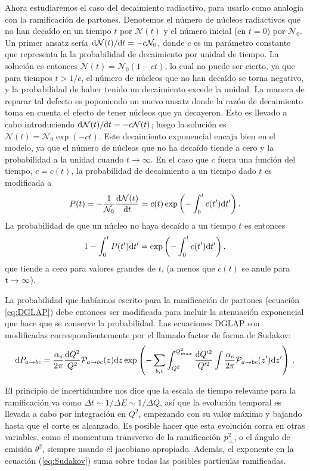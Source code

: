 \documentclass[a4paper,12pt]{article}
\begin{document}
Ahora estudiaremos el caso del decaimiento radiactivo, para usarlo como analogía con la ramificación de partones. Denotemos el número de núcleos radiactivos que no han decaído en un tiempo $t$ por $\mathcal N(t)$ y el número inicial (en $t=0$) por $\mathcal N_0$. Un primer ansatz sería ${\mathrm d}\mathcal N(t)/{\mathrm d} t = -c \mathcal N_0$, donde $c$ es un parámetro constante que representa la la probabilidad de decaimiento por unidad de tiempo. La solución es entonces $\mathcal N (t) = \mathcal N_0(1-ct)$, lo cual no puede ser cierto, ya que para tiempos $t>1/c$, el número de núcleos que no han decaído se torna negativo, y la probabilidad de haber tenido un decaimiento excede la unidad. La manera de reparar tal defecto es poponiendo un nuevo ansatz donde la razón de decaimiento toma en cuenta el efecto de tener núcleos que ya decayeron. Esto es llevado a cabo introduciendo ${\mathrm d}\mathcal N(t)/{\mathrm d} t = -c \mathcal N(t)$; luego la solución es $\mathcal N(t) = \mathcal N_0 \exp(-ct)$. Este decaimiento exponencial encaja bien en el modelo, ya que el número de núcleos que no ha decaído tiende a cero y la probabilidad a la unidad cuando $t\to \infty$. En el caso que $c$ fuera una función del tiempo, $c=c(t)$, la probabilidad de decaimiento a un tiempo dado $t$ es modificada a
$$P(t)=-\frac{1}{\mathcal N_0} \frac{{\mathrm d}\mathcal N (t)}{{\mathrm d} t} = c(t) \exp\left(-\int_0^t c(t') {\mathrm d} t'\right).$$
La probabilidad de que un núcleo no haya decaído a un tiempo $t$ es entonces
$$1- \int_0^t P(t'){\mathrm d} t' = \exp \left(-\int_0^t c(t'){\mathrm d} t' \right),$$
que tiende a cero para valores grandes de $t$, (a menos que $c(t)$ se anule para ${\mathrm t}\to\infty$).

La probabilidad que habíamos escrito para la ramificación de partones (ecuación \ref{eq:DGLAP}) debe entonces ser modificada para incluir la atenuación exponencial que hace que se conserve la probabilidad. Las ecuaciones DGLAP son modificadas correspondientemente por el llamado factor de forma de Sudakov:
\begin{equation}
  {\mathrm d} P_{a\to bc} = \frac{\alpha_{\mathrm{s}}}{2\pi}\frac{{\mathrm d} Q^2}{Q^2}\mathcal{P}_{a\to bc}(z) {\mathrm d} z \exp \left( -\sum_{b,c}\int^{Q^2_{max}}_{Q^2}\frac{{\mathrm d} Q'^2}{Q'^2} \int \frac{\alpha_{\mathrm{s}}}{2\pi} \mathcal{P}_{a\to bc}(z') {\mathrm d} z' \right)
  \label{eq:Sudakov}
  \, .
\end{equation}

El principio de incertidumbre nos dice que la escala de tiempo relevante para la ramificación va como $\Delta t \sim 1/\Delta E \sim 1/\Delta Q$, así que la evolución temporal es llevada a cabo por integración en $Q^2$, empezando con su valor máximo y bajando hasta que el corte es alcanzado. Es posible hacer que esta evolución corra en otras variables, como el momentum transverso de la ramificación $p_{\perp}^2$, o el ángulo de emisión $\theta^2$, siempre usando el jacobiano apropiado. Además, el exponente en la ecuación (\ref{eq:Sudakov}) suma sobre todas las posibles partículas ramificadas.
\end{document}
